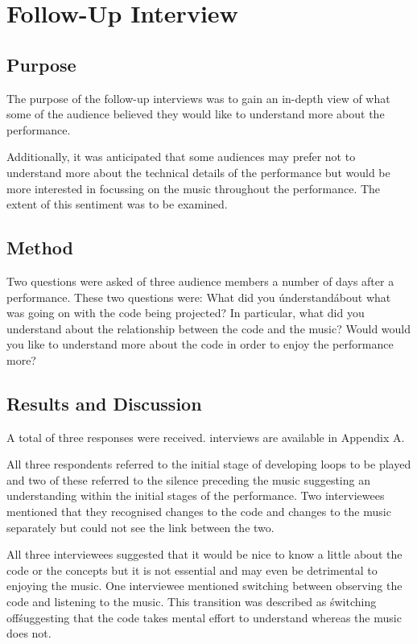 
\chapter{Follow-Up Interview}

\section{Purpose}
The purpose of the follow-up interviews was to gain an in-depth view of what some of the audience believed they would like to understand more about the performance.

Additionally, it was anticipated that some audiences may prefer not to understand more about the technical details of the performance but would be more interested in focussing on the music throughout the performance. The extent of this sentiment was to be examined.

\section{Method}
Two questions were asked of three audience members a number of days after a performance. These two questions were:
What did you \'understand\' about what was going on with the code being projected? In particular, what did you understand about the relationship between the code and the music?
Would would you like to understand more about the code in order to enjoy the performance more?

\section{Results and Discussion}
A total of three responses were received. interviews are available in Appendix A.

All three respondents referred to the initial stage of developing loops to be played and two of these referred to the silence preceding the music suggesting an understanding within the initial stages of the performance. Two interviewees mentioned that they recognised changes to the code and changes to the music separately but could not see the link between the two.

All three interviewees suggested that it would be nice to know a little about the code or the concepts but it is not essential and may even be detrimental to enjoying the music. One interviewee mentioned switching between observing the code and listening to the music. This transition was described as \'switching off\' suggesting that the code takes mental effort to understand whereas the music does not.